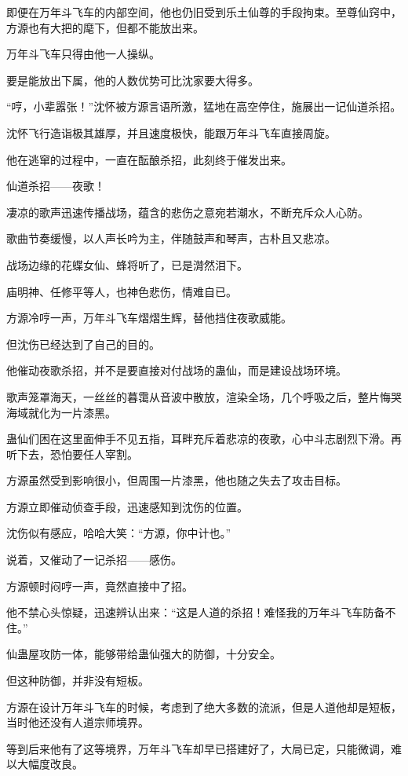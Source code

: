 \begin{this_body}
即便在万年斗飞车的内部空间，他也仍旧受到乐土仙尊的手段拘束。至尊仙窍中，方源也有大把的麾下，但都不能放出来。

万年斗飞车只得由他一人操纵。

要是能放出下属，他的人数优势可比沈家要大得多。

“哼，小辈嚣张！”沈怀被方源言语所激，猛地在高空停住，施展出一记仙道杀招。

沈怀飞行造诣极其雄厚，并且速度极快，能跟万年斗飞车直接周旋。

他在逃窜的过程中，一直在酝酿杀招，此刻终于催发出来。

仙道杀招——夜歌！

凄凉的歌声迅速传播战场，蕴含的悲伤之意宛若潮水，不断充斥众人心防。

歌曲节奏缓慢，以人声长吟为主，伴随鼓声和琴声，古朴且又悲凉。

战场边缘的花蝶女仙、蜂将听了，已是潸然泪下。

庙明神、任修平等人，也神色悲伤，情难自已。

方源冷哼一声，万年斗飞车熠熠生辉，替他挡住夜歌威能。

但沈伤已经达到了自己的目的。

他催动夜歌杀招，并不是要直接对付战场的蛊仙，而是建设战场环境。

歌声笼罩海天，一丝丝的暮霭从音波中散放，渲染全场，几个呼吸之后，整片悔哭海域就化为一片漆黑。

蛊仙们困在这里面伸手不见五指，耳畔充斥着悲凉的夜歌，心中斗志剧烈下滑。再听下去，恐怕要任人宰割。

方源虽然受到影响很小，但周围一片漆黑，他也随之失去了攻击目标。

方源立即催动侦查手段，迅速感知到沈伤的位置。

沈伤似有感应，哈哈大笑：“方源，你中计也。”

说着，又催动了一记杀招——感伤。

方源顿时闷哼一声，竟然直接中了招。

他不禁心头惊疑，迅速辨认出来：“这是人道的杀招！难怪我的万年斗飞车防备不住。”

仙蛊屋攻防一体，能够带给蛊仙强大的防御，十分安全。

但这种防御，并非没有短板。

方源在设计万年斗飞车的时候，考虑到了绝大多数的流派，但是人道他却是短板，当时他还没有人道宗师境界。

等到后来他有了这等境界，万年斗飞车却早已搭建好了，大局已定，只能微调，难以大幅度改良。


\end{this_body}
